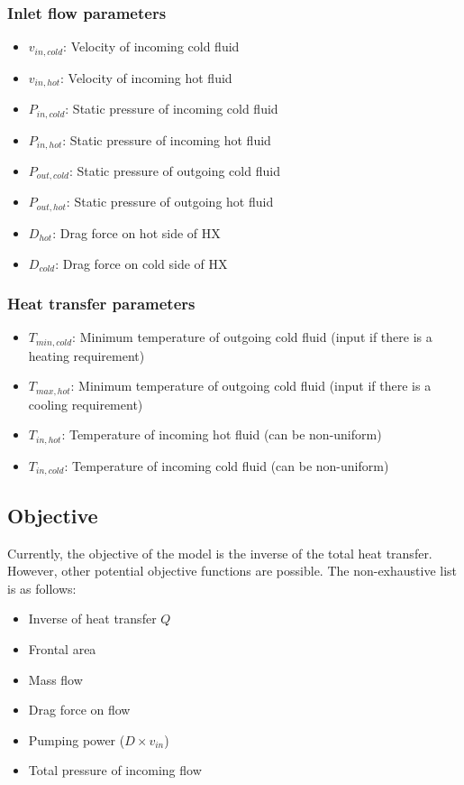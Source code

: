 \documentclass{article}
\begin{document}
\subsubsection{Inlet flow parameters}

\begin{itemize}
\item $v_{in, cold}$: Velocity of incoming cold fluid
\item $v_{in, hot}$: Velocity of incoming hot fluid
\item $P_{in, cold}$: Static pressure of incoming cold fluid
\item $P_{in, hot}$: Static pressure of incoming hot fluid
\item $P_{out, cold}$: Static pressure of outgoing cold fluid
\item $P_{out, hot}$: Static pressure of outgoing hot fluid
\item $D_{hot}$: Drag force on hot side of HX
\item $D_{cold}$: Drag force on cold side of HX
\end{itemize}

\subsubsection{Heat transfer parameters}

\begin{itemize}
	\item $T_{min,cold}$: Minimum temperature of outgoing cold fluid (input if there is a heating requirement)
	\item $T_{max, hot}$: Minimum temperature of outgoing cold fluid (input if there is a cooling requirement)
	\item $T_{in, hot}$: Temperature of incoming hot fluid (can be non-uniform)
	\item $T_{in, cold}$: Temperature of incoming cold fluid (can be non-uniform)
\end{itemize}

\subsection{Objective}
\label{ss:objectives}

Currently, the objective of the model is the inverse of the total heat transfer. However, other potential objective functions are possible. The non-exhaustive list is as follows:

\begin{itemize}
\item Inverse of heat transfer $Q$
\item Frontal area
\item Mass flow
\item Drag force on flow
\item Pumping power ($D \times v_{in}$)
\item Total pressure of incoming flow
\end{itemize}
\end{document}
